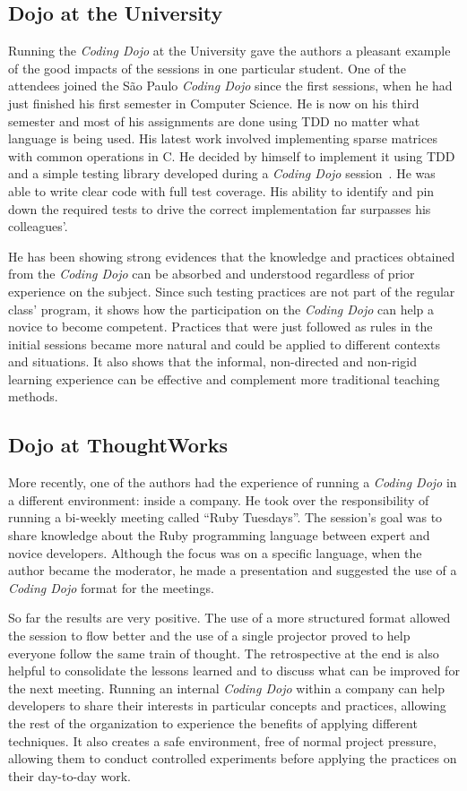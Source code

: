 \subsection{Dojo at the University}

Running the \emph{Coding Dojo} at the University gave the authors a pleasant example of
the good impacts of the sessions in one particular student. One of the attendees joined the São
Paulo \emph{Coding Dojo} since the first sessions,
when he had just finished his first semester in Computer Science. He is now on his third semester
and most of his assignments are done using TDD no matter what language is being used. His latest
work involved implementing sparse matrices with common operations in C. He decided by himself to
implement it using TDD and a simple testing library developed during a \emph{Coding Dojo}
session~\cite{Dojo31}. He was able to write clear code with full test coverage. His ability to
identify and pin down the required tests to drive the correct implementation far surpasses his
colleagues'.

He has been showing strong evidences that the knowledge and practices obtained from the
\emph{Coding Dojo} can be absorbed and understood regardless of prior experience on the
subject. Since such testing practices are not part of the regular class' program, it shows
how the participation on the \emph{Coding Dojo} can help a novice to become competent. Practices
that were just followed as rules in the initial sessions became more natural and could be applied
to different contexts and situations. It also shows that the informal, non-directed and non-rigid
learning experience can be effective and complement more traditional teaching methods.

\subsection{Dojo at ThoughtWorks}

More recently, one of the authors had the experience of running a
\emph{Coding Dojo} in a different environment: inside a company. He
took over the responsibility of running a bi-weekly meeting called
``Ruby Tuesdays''. The session's goal was to share knowledge about the
Ruby programming language between expert and novice
developers. Although the focus was on a specific language,
when the author became the moderator, he made a presentation and
suggested the use of a \emph{Coding Dojo} format for the meetings.

So far the results are very positive. The use of a more structured format allowed the session to
flow better and the use of a single projector proved to help everyone follow the same train of
thought. The retrospective at the end is also helpful to consolidate the lessons learned and to
discuss what can be improved for the next meeting. Running an internal \emph{Coding Dojo} within
a company can help developers to share their interests in particular concepts and practices, allowing
the rest of the organization to experience the benefits of applying different techniques. It also
creates a safe environment, free of normal project pressure, allowing them to conduct controlled
experiments before applying the practices on their day-to-day work.